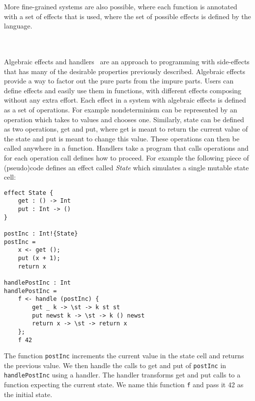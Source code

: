 More fine-grained systems are also possible, where each function is annotated with a set of effects that is used, where the set of possible effects is defined by the language.
\iffalse
For example in Koka a function which prints something to the console may be given the type:
\begin{verbatim}
string -> <console> () 
\end{verbatim}
Where \textsc{console} shows the use of the console.
User-defined effects are also supported in languages such as Koka and Eff.
Users, in those systems, can define the effects with which the functions are annotated.
\fi
\\\\
Algebraic effects and handlers~\autocite{algeff} are an approach to programming with side-effects that has many of the desirable properties previously described.
Algebraic effects provide a way to factor out the pure parts from the impure parts.
Users can define effects and easily use them in functions, with different effects composing without any extra effort.
Each effect in a system with algebraic effects is defined as a set of operations.
For example nondeterminism can be represented by an operation which takes to values and chooses one.
Similarly, state can be defined as two operations, get and put, where get is meant to return the current value of the state and put is meant to change this value.
These operations can then be called anywhere in a function.
Handlers take a program that calls operations and for each operation call defines how to proceed.
For example the following piece of (pseudo)code defines an effect called \textit{State} which simulates a single mutable state cell:
\begin{verbatim}
effect State {
	get : () -> Int
	put : Int -> ()
}

postInc : Int!{State}
postInc =
	x <- get ();
	put (x + 1);
	return x
	
handlePostInc : Int
handlePostInc =
	f <- handle (postInc) {
		get _ k -> \st -> k st st
		put newst k -> \st -> k () newst
		return x -> \st -> return x
	};
	f 42
\end{verbatim}
The function \texttt{postInc} increments the current value in the state cell and returns the previous value.
We then handle the calls to get and put of \texttt{postInc} in \texttt{handlePostInc} using a handler.
The handler transforms get and put calls to a function expecting the current state.
We name this function \texttt{f} and pass it 42 as the initial state.

